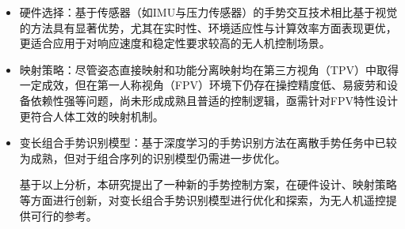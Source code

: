 \begin{itemize}
    \item 硬件选择：基于传感器（如IMU与压力传感器）的手势交互技术相比基于视觉的方法具有显著优势，尤其在实时性、环境适应性与计算效率方面表现更优，更适合应用于对响应速度和稳定性要求较高的无人机控制场景。

    \item 映射策略：尽管姿态直接映射和功能分离映射均在第三方视角（TPV）中取得一定成效，但在第一人称视角（FPV）环境下仍存在操控精度低、易疲劳和设备依赖性强等问题，尚未形成成熟且普适的控制逻辑，亟需针对FPV特性设计更符合人体工效的映射机制。

    \item 变长组合手势识别模型：基于深度学习的手势识别方法在离散手势任务中已较为成熟，但对于组合序列的识别模型仍需进一步优化。

基于以上分析，本研究提出了一种新的手势控制方案，在硬件设计、映射策略等方面进行创新，对变长组合手势识别模型进行优化和探索，为无人机遥控提供可行的参考。

\end{itemize}


\ifx\allfiles\undefined
\clearpage
\printbibliography

\fi
